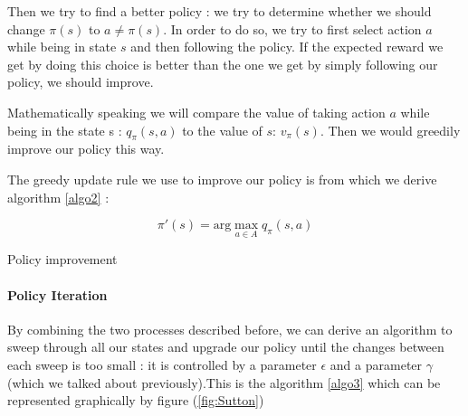 \documentclass[14pt,a4paper]{article}
\theoremstyle{definition}
\begin{document}
Then we try to find a better policy : we try to determine whether we should change $\pi(s) $ to $ a\neq\pi(s)$. In order to do so, we try to first select action $a$ while being in state $s$ and then following the policy. If the expected reward we get by doing this choice is better than the one we get by simply following our policy, we should improve.

Mathematically speaking we will compare the value of taking action $a$ while being in the state s : $q_{\pi}(s,a)$ to the value of $s$: $v_{\pi}(s)$. Then we would greedily improve our policy this way.

The greedy update rule we use to improve our policy is from which we derive algorithm \ref{algo2} : 

$$ 
\pi'(s)=\text{arg}\max_{a \in A}q_{\pi}(s,a)
$$

\begin{algorithm}
\label{algo2}

    
    \caption{Policy improvement}
\end{algorithm}



\paragraph{Policy Iteration} By combining the two processes described before, we can derive an algorithm to sweep through all our states and upgrade our policy until the changes between each sweep is too small : it is controlled by a parameter $\epsilon$ and a parameter $\gamma$ (which we talked about previously).This is the algorithm \ref{algo3} which can be represented graphically by figure (\ref{fig:Sutton})
\end{document}
